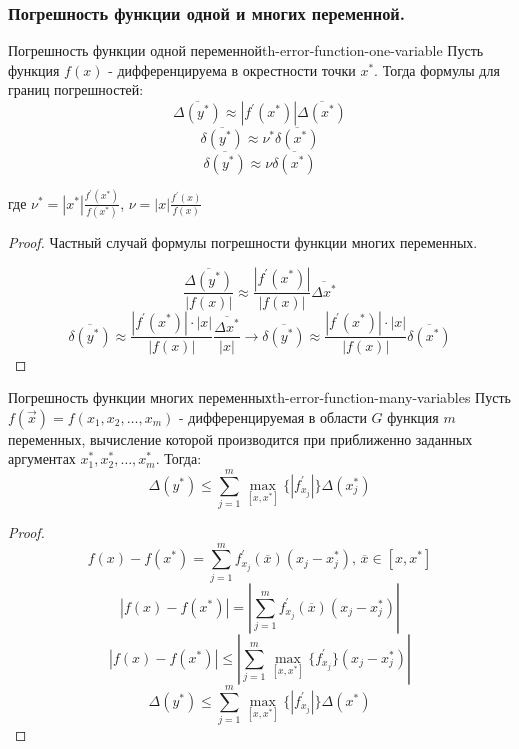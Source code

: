 \documentclass[14pt]{extarticle}
\begin{document}
    \subsubsection{Погрешность функции одной и многих переменной.}

        \begin{theorem}{Погрешность функции одной переменной}{th-error-function-one-variable}
            Пусть функция $f(x)$ - дифференцируема в окрестности точки $x^{*}$. Тогда формулы для границ погрешностей:
            $$\overline{\Delta(y^{*})} \approx |f^{'}(x^{*})|\overline{\Delta(x^{*})}$$
            $$\overline{\delta(y^{*})} \approx \nu^{*}\overline{\delta(x^{*})}$$
            $$\overline{\delta(y^{*})} \approx \nu \overline{\delta(x^{*})}$$
        
            где $\nu^{*} = |x^{*}| \frac{f^{'}(x^{*})}{f(x^{*})}$, $\nu = |x| \frac{f^{'}(x)}{f(x)}$
       
            \begin{proof}
                Частный случай формулы погрешности функции многих переменных.
                 
                $$\frac{\overline{\Delta(y^{*})}}{|f(x)|} \approx \frac{|f^{'}(x^{*})|}{|f(x)|}\overline{\Delta{x^{*}}}$$
                $$\overline{\delta(y^{*})} \approx \frac{|f^{'}(x^{*})| \cdot |x|}{|f(x)|} \frac{\overline{\Delta{x^{*}}}}{|x|} \rightarrow \overline{\delta(y^{*})} \approx \frac{|f^{'}(x^{*})| \cdot |x|}{|f(x)|} \overline{\delta(x^{*})}$$
            \end{proof}
        \end{theorem}

        \begin{theorem}{Погрешность функции многих переменных}{th-error-function-many-variables}
            Пусть $f(\vec{x}) = f(x_{1}, x_{2}, \ldots, x_{m})$ - дифференцируемая в области $G$ функция $m$ переменных, вычисление которой производится при приближенно заданных аргументах $x_{1}^{*}, x_{2}^{*}, \ldots, x_{m}^{*}$. Тогда:
            $$\Delta(y^{*}) \leq \sum_{j=1}^{m} \max_{[x, x^{*}]}\{|f_{x_{j}}^{'}|\}\Delta(x_{j}^{*})$$
        
            \begin{proof}
                $$f(x) - f(x^{*}) = \sum_{j=1}^{m} f_{x_{j}}^{'}(\overline{x})(x_{j} - x_{j}^{*}) \text{, } \overline{x} \in [x, x^{*}]$$
                $$|f(x) - f(x^{*})| = |\sum_{j=1}^{m} f_{x_{j}}^{'}(\overline{x})(x_{j} - x_{j}^{*})|$$
                $$|f(x) - f(x^{*})| \leq |\sum_{j=1}^{m} \max_{[x, x^{*}]} \{f_{x_{j}}^{'}\}(x_{j} - x_{j}^{*})|$$
                $$\Delta(y^{*}) \leq \sum_{j=1}^{m} \max_{[x, x^{*}]} \{|f_{x_{j}}^{'}|\}\Delta(x^{*})$$
            \end{proof}
        \end{theorem}
\end{document}

